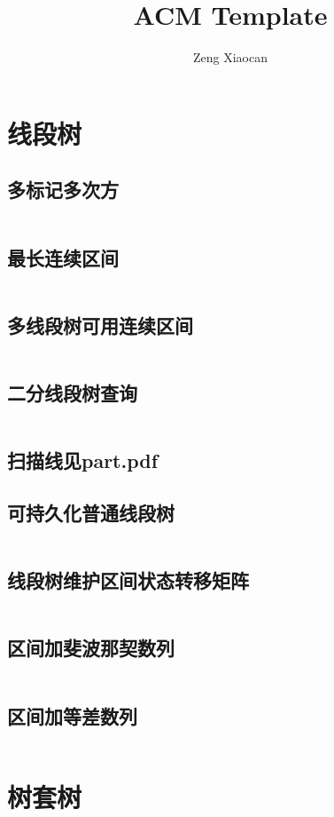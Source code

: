 \documentclass[a4paper,12pt]{article}
\author{Zeng Xiaocan}
\title{ACM Template}
\begin{document}
 
\section*{线段树}
\subsection*{多标记多次方}
\inputminted[]{c++}{code/hdu4578.cpp}
\subsection*{最长连续区间}
\inputminted[]{c++}{code/hdu1540.cpp}
\subsection*{多线段树可用连续区间}
\inputminted[]{c++}{code/hdu4553.cpp}
\subsection*{二分线段树查询}
\inputminted[]{c++}{code/hdu4614.cpp}
\subsection*{扫描线见part.pdf}
\subsection*{可持久化普通线段树}
\inputminted[]{c++}{code/hdu4348.cpp}
\subsection*{线段树维护区间状态转移矩阵}
\inputminted[]{c++}{code/cf705E.cpp}
\subsection*{区间加斐波那契数列}
\inputminted[]{c++}{code/cf446C.cpp}
\subsection*{区间加等差数列}
\inputminted[]{c++}{code/luoguP1438.cpp}
\section*{树套树}
\end{document}
